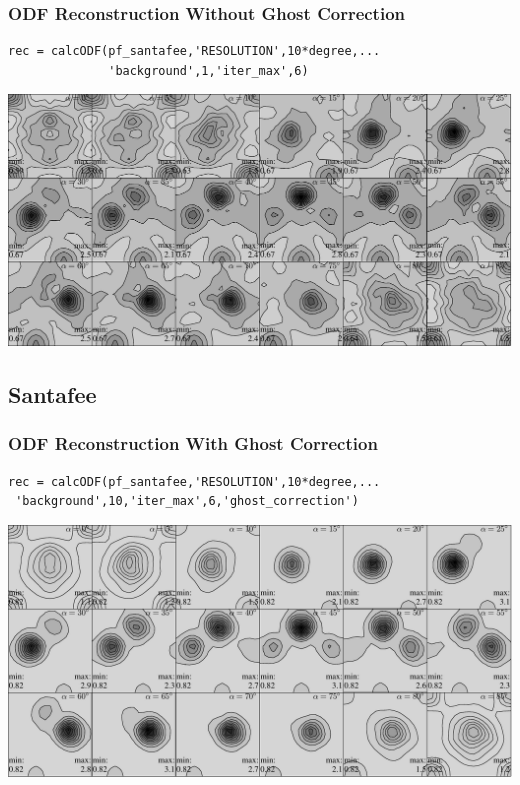 \begin{frame}[fragile]
  \frametitle{ODF Reconstruction Without Ghost Correction}

\begin{lstlisting}
rec = calcODF(pf_santafee,'RESOLUTION',10*degree,...
              'background',1,'iter_max',6)
\end{lstlisting}

\includegraphics[width=\textwidth]{pic/rec_santafee}

\end{frame}
\subsection*{Santafee}

\begin{frame}[fragile]
  \frametitle{ODF Reconstruction With Ghost Correction}

\begin{lstlisting}
rec = calcODF(pf_santafee,'RESOLUTION',10*degree,...
 'background',10,'iter_max',6,'ghost_correction')
\end{lstlisting}

\includegraphics[width=\textwidth]{pic/rec_santafee_ghost_correction}

\end{frame}


